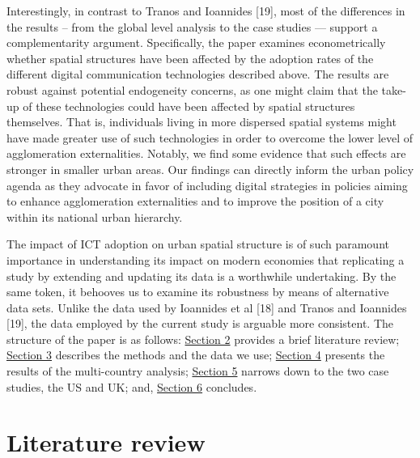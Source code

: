 \documentclass[10pt,letterpaper]{article}
\begin{document}
Interestingly, in contrast to Tranos and Ioannides {[}19{]}, most of the
differences in the results -- from the global level analysis to the case
studies --- support a complementarity argument. Specifically, the paper
examines econometrically whether spatial structures have been affected
by the adoption rates of the different digital communication
technologies described above. The results are robust against potential
endogeneity concerns, as one might claim that the take-up of these
technologies could have been affected by spatial structures themselves.
That is, individuals living in more dispersed spatial systems might have
made greater use of such technologies in order to overcome the lower
level of agglomeration externalities. Notably, we find some evidence
that such effects are stronger in smaller urban areas. Our findings can
directly inform the urban policy agenda as they advocate in favor of
including digital strategies in policies aiming to enhance agglomeration
externalities and to improve the position of a city within its national
urban hierarchy.

The impact of ICT adoption on urban spatial structure is of such
paramount importance in understanding its impact on modern economies
that replicating a study by extending and updating its data is a
worthwhile undertaking. By the same token, it behooves us to examine its
robustness by means of alternative data sets. Unlike the data used by
Ioannides et al {[}18{]} and Tranos and Ioannides {[}19{]}, the data
employed by the current study is arguable more consistent. The structure
of the paper is as follows: \protect\hyperlink{sec2}{Section 2} provides
a brief literature review; \protect\hyperlink{sec3}{Section 3} describes
the methods and the data we use; \protect\hyperlink{sec4}{Section 4}
presents the results of the multi-country analysis;
\protect\hyperlink{sec5}{Section 5} narrows down to the two case
studies, the US and UK; and, \protect\hyperlink{sec6}{Section 6}
concludes.

\hypertarget{sec2}{%
\section{Literature review}\label{sec2}}
\end{document}
